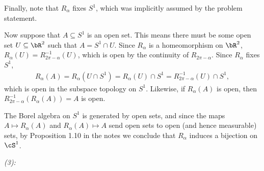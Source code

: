 \begin{homework}[e]
\begin{prf}
		Finally, note that $R_\alpha$ fixes $S^1$, which was implicitly assumed by the problem statement.

		Now suppose that $A \subseteq S^1$ is an open set. This means there must be some open set $U \subseteq \bR^2$ such that $A = S^1 \cap U$. Since $R_\alpha$ is a homeomorphism on $\bR^2$, $R_\alpha(U) = R^{-1}_{2\pi - \alpha}(U)$, which is open by the continuity of $R_{2\pi - \alpha}$. Since $R_\alpha$ fixes $S^1$,
		\begin{align*}
			R_\alpha(A) = R_\alpha(U \cap S^1) = R_\alpha(U) \cap S^1 = R^{-1}_{2\pi - \alpha}(U) \cap S^1,
		\end{align*}
		which is open in the subspace topology on $S^1$. Likewise, if $R_\alpha(A)$ is open, then $R^{-1}_{2\pi - \alpha}(R_\alpha(A)) = A$ is open.

		The Borel algebra on $S^1$ is generated by open sets, and since the maps $A \mapsto R_\alpha(A)$ and $R_\alpha(A) \mapsto A$ send open sets to open (and hence measurable) sets, by Proposition 1.10 in the notes we conclude that $R_\alpha$ induces a bijection on $\cS^1$.

		\bigskip

		\noindent \emph{(3):} \hspace{0.5em} 
	\end{prf}
\end{homework}

